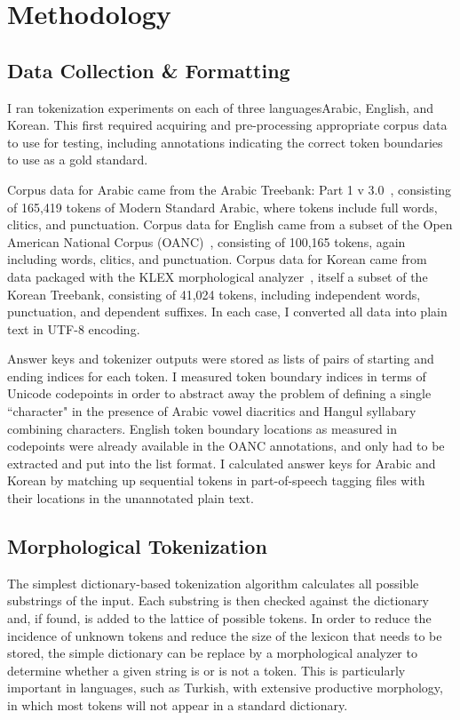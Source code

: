 \chapter{Methodology}

\section{Data Collection \& Formatting}
I ran tokenization experiments on each of three languages\textemdash Arabic, English, and Korean. This first required acquiring and pre-processing appropriate corpus data to use for testing, including annotations indicating the correct token boundaries to use as a gold standard.

Corpus data for Arabic came from the Arabic Treebank: Part 1 v 3.0~\cite{maamouri05}, consisting of 165,419 tokens of Modern Standard Arabic, where tokens include full words, clitics, and punctuation. Corpus data for English came from a subset of the Open American National Corpus (OANC)~\cite{oanc}, consisting of 100,165 tokens, again including words, clitics, and punctuation. Corpus data for Korean came from data packaged with the KLEX morphological analyzer~\cite{han04}, itself a subset of the Korean Treebank, consisting of 41,024 tokens, including independent words, punctuation, and dependent suffixes. In each case, I converted all data into plain text in UTF-8 encoding.

Answer keys and tokenizer outputs were stored as lists of pairs of starting and ending indices for each token. I measured token boundary indices in terms of Unicode codepoints in order to abstract away the problem of defining a single ``character" in the presence of Arabic vowel diacritics and Hangul syllabary combining characters. English token boundary locations as measured in codepoints were already available in the OANC annotations, and only had to be extracted and put into the list format. I calculated answer keys for Arabic and Korean by matching up sequential tokens in part-of-speech tagging files with their locations in the unannotated plain text. 

\section{Morphological Tokenization}
The simplest dictionary-based tokenization algorithm calculates all possible substrings of the input. Each substring is then checked against the dictionary and, if found, is added to the lattice of possible tokens. In order to reduce the incidence of unknown tokens and reduce the size of the lexicon that needs to be stored, the simple dictionary can be replace by a morphological analyzer to determine whether a given string is or is not a token. This is particularly important in languages, such as Turkish, with extensive productive morphology, in which most tokens will not appear in a standard dictionary.

